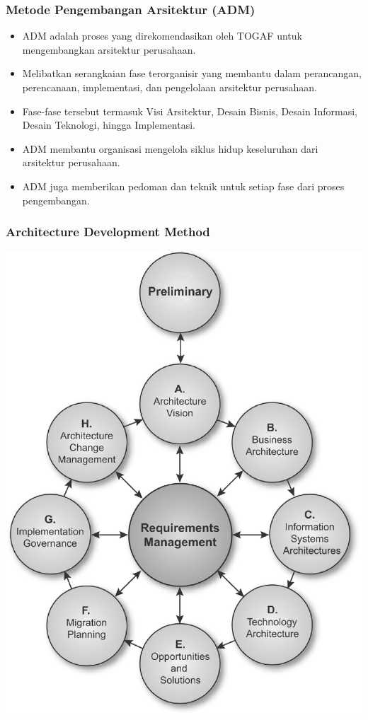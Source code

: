 \documentclass[aspectratio=169]{beamer}
\begin{document}
	
	\begin{frame}
		\frametitle{Metode Pengembangan Arsitektur (ADM)}
		\begin{itemize}
			\item ADM adalah proses yang direkomendasikan oleh TOGAF untuk mengembangkan arsitektur perusahaan.
			\item Melibatkan serangkaian fase terorganisir yang membantu dalam perancangan, perencanaan, implementasi, dan pengelolaan arsitektur perusahaan.
			\item Fase-fase tersebut termasuk Visi Arsitektur, Desain Bisnis, Desain Informasi, Desain Teknologi, hingga Implementasi.
			\item ADM membantu organisasi mengelola siklus hidup keseluruhan dari arsitektur perusahaan.
			\item ADM juga memberikan pedoman dan teknik untuk setiap fase dari proses pengembangan.
		\end{itemize}
	\end{frame}
	
	{
		\begin{frame}
			\frametitle{Architecture Development Method}
			\begin{center}
				\includegraphics[width=.43\textwidth]{../figures/architecture_development_method}
			\end{center}
		\end{frame}
	}
	
\end{document}
